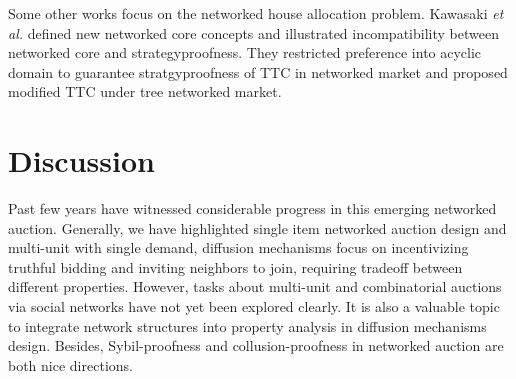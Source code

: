 \documentclass{article}
\begin{document}
Some other works \cite{zheng2020barter,2021networkedhousingmarket} focus on the networked house allocation problem. Kawasaki \emph{et al.}  defined new networked core concepts and illustrated incompatibility between networked core and strategyproofness. They restricted preference into acyclic domain to guarantee stratgyproofness of TTC in networked market and  proposed modified TTC under tree networked market.


\section{Discussion}

Past few years have witnessed considerable progress in this emerging networked auction. Generally, we have highlighted single item networked auction  design and multi-unit with single demand, diffusion mechanisms focus on incentivizing truthful bidding and inviting neighbors to join, requiring tradeoff between different properties. However, tasks about multi-unit and combinatorial auctions via social networks have not yet 
been explored clearly. It is also a valuable topic to integrate network structures into property analysis in diffusion mechanisms design. Besides, Sybil-proofness \cite{todo2020split} and collusion-proofness in networked auction are both nice directions. 
\end{document}
